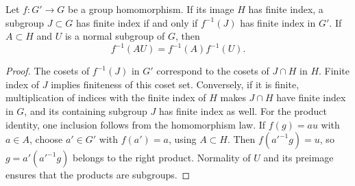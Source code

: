 \begin{lemma}
\label{fw:finite-index-base-restriction}
\leanok
Let $f:G'\to G$ be a group homomorphism. If its image $H$ has finite
index, a subgroup $J\subset G$ has finite index if and only if
$f^{-1}(J)$ has finite index in $G'$. If $A\subset H$ and $U$ is a
normal subgroup of $G$, then
\[
 f^{-1}(AU)=f^{-1}(A)f^{-1}(U).
\]
\end{lemma}
\begin{proof}
The cosets of $f^{-1}(J)$ in $G'$ correspond to the cosets of
$J\cap H$ in $H$. Finite index of $J$ implies finiteness of this
coset set. Conversely, if it is finite, multiplication of indices
with the finite index of $H$ makes $J\cap H$ have finite index in
$G$, and its containing subgroup $J$ has finite index as well.
For the product identity, one inclusion follows from the homomorphism
law. If $f(g)=au$ with $a\in A$, choose $a'\in G'$ with $f(a')=a$,
using $A\subset H$. Then $f(a'^{-1}g)=u$, so
$g=a'(a'^{-1}g)$ belongs to the right product. Normality of $U$ and
its preimage ensures that the products are subgroups.
\end{proof}


